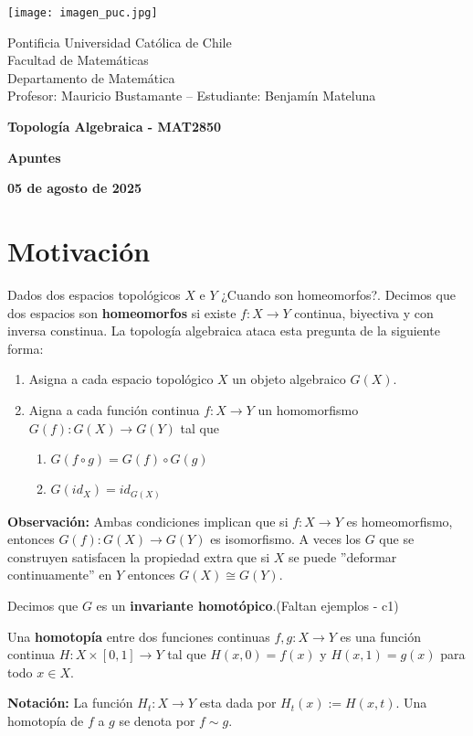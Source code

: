 \documentclass{article}
\begin{document}
\begin{minipage}{2.5cm}
    \texttt{[image: imagen\_puc.jpg]}
\end{minipage}
\begin{minipage}{14cm}
    {\sc Pontificia Universidad Católica de Chile\\
    Facultad de Matemáticas\\
    Departamento de Matemática\\
    Profesor: Mauricio Bustamante -- Estudiante: Benjamín Mateluna}
\end{minipage}
\vspace{1ex}

{\centerline{\bf Topología Algebraica - MAT2850}
\centerline{\bf Apuntes}}
\centerline{\bf 05 de agosto de 2025}

\newpage
\tableofcontents

\newpage
\section*{Motivación}
{}
\noindent Dados dos espacios topológicos $X$ e $Y$ ¿Cuando son homeomorfos?. Decimos que dos 
espacios son \textbf{homeomorfos} si existe $f:X\to Y$ continua, biyectiva y con inversa 
constinua. La topología algebraica ataca esta pregunta de la siguiente forma:
\begin{enumerate}
    \item Asigna a cada espacio topológico $X$ un objeto algebraico $G(X)$.
    \item Aigna a cada función continua $f:X\to Y$ un homomorfismo $G(f):G(X)\to G(Y)$ tal que
    \begin{enumerate}
        \item $G(f\circ g)=G(f)\circ G(g)$
        \item $G(id_{X})=id_{G(X)}$
    \end{enumerate}
\end{enumerate}
\noindent\textbf{Observación:} Ambas condiciones implican que si $f:X\to Y$ es homeomorfismo, 
entonces $G(f):G(X)\to G(Y)$ es isomorfismo. A veces los $G$ que se construyen satisfacen la 
propiedad extra que si $X$ se puede ''deformar continuamente'' en $Y$ entonces $G(X)\cong G(Y)$.

\vspace{2mm}
\noindent Decimos que $G$ es un \textbf{invariante homotópico}.(Faltan ejemplos - c1)

\vspace{2mm}
\begin{dfn}
    Una \textbf{homotopía} entre dos funciones continuas $f,g:X\to Y$ es una función continua 
    $H:X\times[0,1]\to Y$ tal que $H(x,0)=f(x)$ y $H(x,1)=g(x)$ para todo $x\in X$.
\end{dfn}
\noindent\textbf{Notación:} La función $H_{t}:X\to Y$ esta dada por $H_{t}(x):=H(x,t)$. Una 
homotopía de $f$ a $g$ se denota por $f\sim g$.
\end{document}
